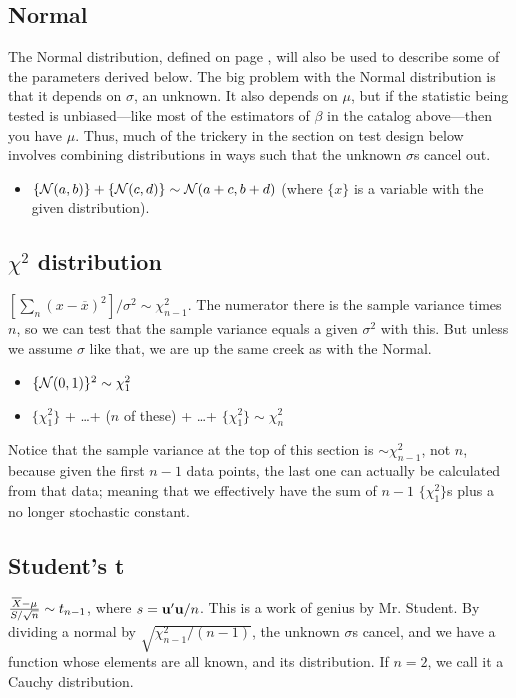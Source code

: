 \subsection{Normal} 

The Normal distribution, defined on page \pageref{normal},
will also be used to describe some of the parameters derived below.
The big problem with the Normal distribution is that it depends on $\sigma$, an
unknown. It also depends on $\mu$, but if the statistic
being tested is unbiased---like most of the estimators of $\beta$ in the
catalog above---then you have $\mu$. Thus, much of the trickery in the
section on test design below involves combining distributions in ways
such that the unknown $\sigma$s cancel out.

\begin{itemize}
\item $\{{\cal N} (a,b)\} + \{{\cal N} (c,d)\} \sim {\cal N}
(a+c,b+d)$ (where $\{x\}$ is a variable with the given distribution).
\end{itemize}

\subsection{$\chi^2$ distribution} $[\sum_n (x-\overline
x)^2]/\sigma^2\sim \chi^2_{n-1}$. The numerator there is the sample
variance times $n$, so we can test that the sample variance equals a
given $\sigma^2$ with this. But unless we assume $\sigma$ like that,
we are up the same creek as with the Normal.

\begin{itemize}
\item $\{{\cal N} (0,1)\}^2 \sim \chi^2_1$

\item $\{\chi^2_1\}$ + \dots + ($n$ of these) + \dots + $\{\chi^2_1\} \sim \chi^2_n$

\end{itemize}			\label{chisq}

Notice that the sample variance at the top of this section is $\sim
\chi^2_{n-1}$, not $n$, because given the first $n-1$ data points, the
last one can actually be calculated from that data; meaning that we
effectively have the sum of $n-1$ $\{\chi^2_1\}$s plus a no longer
stochastic constant.

\subsection{Student's t}  ${\overline X - \mu \over S/\sqrt{n}}\sim
t_{n-1}$, where $s={\bf u}'{\bf u}/n$. This is a work of genius by Mr. Student.
By dividing a normal by $\sqrt{\chi^2_{n-1}/(n-1)}$, the unknown
$\sigma$s cancel, and we have a function whose elements are all known,
and its distribution.  If $n=2$, we call it a Cauchy distribution.
\label{tstat}


